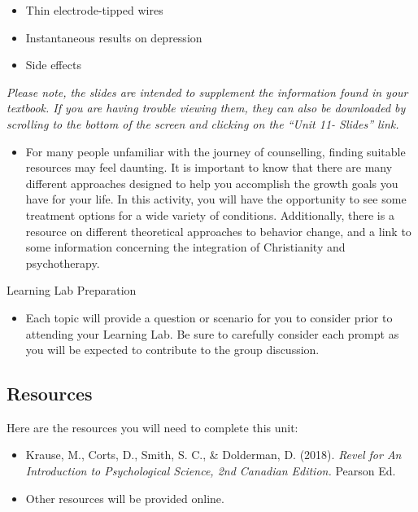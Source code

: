 \documentclass[
]{book}
\providecommand{\tightlist}{%
  \setlength{\itemsep}{0pt}\setlength{\parskip}{0pt}}
\begin{document}
\begin{reflect}
\begin{itemize}
  \begin{itemize}
  \tightlist
  \item
    Thin electrode-tipped wires\\
  \item
    Instantaneous results on depression\\
  \item
    Side effects
  \end{itemize}
\end{itemize}

\emph{Please note, the slides are intended to supplement the information found in your textbook. If you are having trouble viewing them, they can also be downloaded by scrolling to the bottom of the screen and clicking on the ``Unit 11- Slides'' link.}

\begin{itemize}
\tightlist
\item
  For many people unfamiliar with the journey of counselling, finding suitable resources may feel daunting. It is important to know that there are many different approaches designed to help you accomplish the growth goals you have for your life. In this activity, you will have the opportunity to see some treatment options for a wide variety of conditions. Additionally, there is a resource on different theoretical approaches to behavior change, and a link to some information concerning the integration of Christianity and psychotherapy.
\end{itemize}

{Learning Lab Preparation}

\begin{itemize}
\tightlist
\item
  Each topic will provide a question or scenario for you to consider prior to attending your Learning Lab. Be sure to carefully consider each prompt as you will be expected to contribute to the group discussion.
\end{itemize}
\end{reflect}

\hypertarget{resources-11}{%
\subsection*{Resources}\label{resources-11}}

Here are the resources you will need to complete this unit:

\begin{itemize}
\tightlist
\item
  Krause, M., Corts, D., Smith, S. C., \& Dolderman, D. (2018). \emph{Revel for An Introduction to Psychological Science, 2nd Canadian Edition.} Pearson Ed.\\
\item
  Other resources will be provided online.
\end{itemize}
\end{document}
